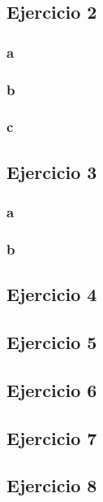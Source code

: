 \documentclass{article}
\begin{document}
\subsection*{Ejercicio 2}

\subsubsection*{a}

\subsubsection*{b}

\subsubsection*{c}


\subsection*{Ejercicio 3}

\subsubsection*{a}

\subsubsection*{b}

\subsection*{Ejercicio 4}

\subsection*{Ejercicio 5}

\subsection*{Ejercicio 6}

\subsection*{Ejercicio 7}

\subsection*{Ejercicio 8}
\end{document}
